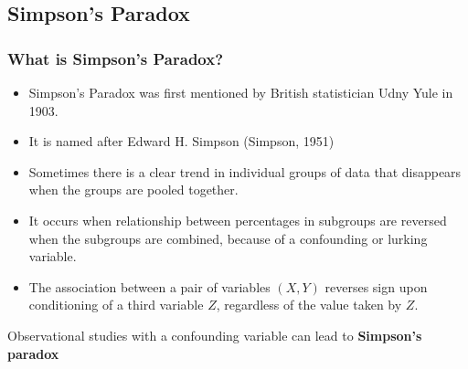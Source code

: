 \documentclass[a4paper]{article}
\begin{document}
\subsection{Simpson's Paradox}
\subsubsection{What is Simpson's Paradox?}
\begin{itemize}
	\item Simpson's Paradox was first mentioned by British statistician Udny Yule in 1903.
	\item It is named after Edward H. Simpson (Simpson, 1951)
	\item Sometimes there is a clear trend in individual groups of data that disappears when the groups are pooled together.
	\item It occurs when relationship between percentages in subgroups are reversed when the subgroups are combined, because of a confounding or lurking variable.
	\item The association between a pair of variables \( (X,Y) \) reverses sign upon conditioning of a third variable \( Z \), regardless of the value taken by \( Z \).
\end{itemize}
\begin{goldbox}
	Observational studies with a confounding variable can lead to \textbf{Simpson's paradox}
\end{goldbox}
\end{document}
